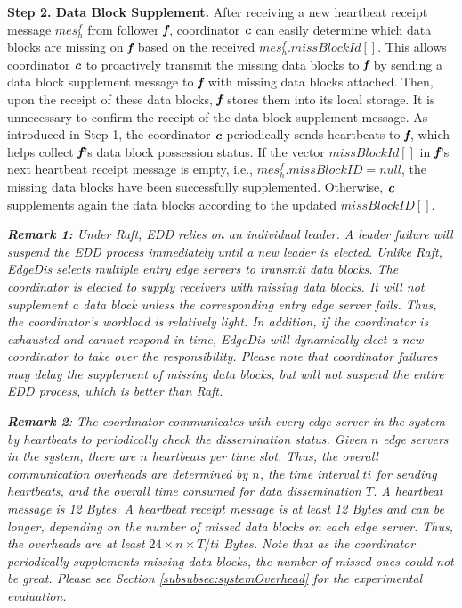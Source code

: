 \documentclass[10pt,journal,compsoc]{IEEEtran}
\def\mathbi#1{\textbf{\em #1}}
\begin{document}
\smallskip
\textbf{Step 2. Data Block Supplement.}
After receiving a new heartbeat receipt message $mes_h^f$ from follower $\mathbi{f}$, coordinator $\mathbi{c}$ can easily determine which data blocks are missing on $\mathbi{f}$ based on the received $mes_h^f.missBlockId[]$.  This allows coordinator $\mathbi{c}$ to proactively transmit the missing data blocks to $\mathbi{f}$ by sending a data block supplement message to $\mathbi{f}$ with missing data blocks attached. Then, upon the receipt of these data blocks, $\mathbi{f}$ stores them into its local storage. It is unnecessary to confirm the receipt of the data block supplement message. As introduced in Step 1, the coordinator $\mathbi{c}$ periodically sends heartbeats to $\mathbi{f}$, which helps collect $\mathbi{f}$'s data block possession status. If the vector $missBlockId[]$ in $\mathbi{f}$'s next heartbeat receipt message is empty, i.e., $mes_h^f.missBlockID=null$, the missing data blocks have been successfully supplemented. Otherwise,  $\mathbi{c}$ supplements again the data blocks according to the updated $missBlockID[]$.


\textit{\textbf{Remark 1: } Under Raft, EDD relies on an individual leader. A leader failure will suspend the EDD process immediately until a new leader is elected. Unlike Raft, EdgeDis selects multiple entry edge servers to transmit data blocks. The coordinator is elected to supply receivers with missing data blocks. It will not supplement a data block unless the corresponding entry edge server fails. Thus, the coordinator's workload is relatively light. In addition, if the coordinator is exhausted and cannot respond in time, EdgeDis will dynamically elect a new coordinator to take over the responsibility. Please note that coordinator failures may delay the supplement of missing data blocks, but will not suspend the entire EDD process, which is better than Raft.}


\textit{\textbf{Remark 2}:  The coordinator communicates with every edge server in the system by heartbeats to periodically check the dissemination status. Given $n$ edge servers in the system, there are $n$ heartbeats per time slot. Thus, the overall communication overheads are determined by $n$, the time interval $ti$ for sending heartbeats, and the overall time consumed for data dissemination $T$.  A heartbeat message is 12 Bytes. A heartbeat receipt message is at least 12 Bytes and can be longer, depending on the number of missed data blocks on each edge server. Thus, the overheads are at least $24\times n\times T/ti$ Bytes. Note that as the coordinator periodically supplements missing data blocks, the number of missed ones could not be great. Please see Section \ref{subsubsec:systemOverhead} for the experimental evaluation.}
\end{document}
